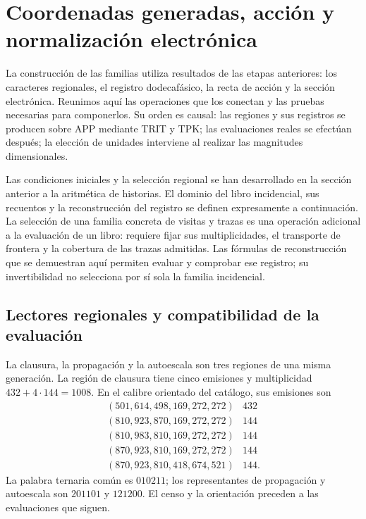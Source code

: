 \section{Coordenadas generadas, acción y normalización electrónica}
\label{vi:dep:seccion}\label{sec:k-registro}

La construcción de las familias utiliza resultados de las etapas anteriores:
los caracteres regionales, el registro dodecafásico, la recta de acción y la
sección electrónica. Reunimos aquí las operaciones que los conectan y las
pruebas necesarias para componerlos. Su orden es causal: las regiones y sus
registros se producen sobre APP mediante TRIT y TPK; las evaluaciones reales
se efectúan después; la elección de unidades interviene al realizar las
magnitudes dimensionales.

Las condiciones iniciales y la selección regional se han desarrollado en
la sección anterior a la aritmética de historias. El dominio del libro
incidencial, sus recuentos y la reconstrucción del registro se definen
expresamente a continuación. La selección de una familia concreta de
visitas y trazas es una operación adicional a la evaluación de un libro:
requiere fijar sus multiplicidades, el transporte de frontera y la
cobertura de las trazas admitidas. Las fórmulas de reconstrucción que se
demuestran aquí permiten evaluar y comprobar ese registro; su
invertibilidad no selecciona por sí sola la familia incidencial.

\subsection{Lectores regionales y compatibilidad de la evaluación}
\label{vi:dep:regiones}

La clausura, la propagación y la autoescala son tres regiones de una misma
generación. La región de clausura tiene cinco emisiones y multiplicidad
\(432+4\cdot144=1008\). En el calibre orientado del catálogo, sus emisiones
son
\[
\begin{array}{c|r}
(501,614,498,169,272,272)&432\\
(810,923,870,169,272,272)&144\\
(810,983,810,169,272,272)&144\\
(870,923,810,169,272,272)&144\\
(870,923,810,418,674,521)&144.
\end{array}
\]
La palabra ternaria común es \(010211\); los representantes de propagación
y autoescala son \(201101\) y \(121200\). El censo y la orientación
preceden a las evaluaciones que siguen.

